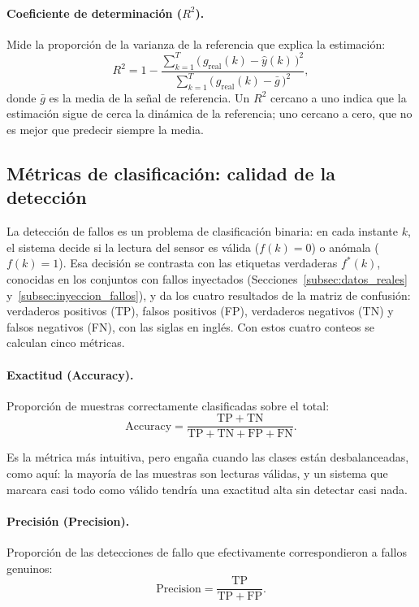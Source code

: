 \documentclass{report}
\begin{document}
\paragraph{Coeficiente de determinación ($R^2$).} Mide la proporción de la varianza de la referencia que explica la estimación:
\begin{equation}
\label{eq:r2}
R^{2} = 1 - \frac{\sum_{k=1}^{T} \big(\, g_{\mathrm{real}}(k) - \hat{y}(k) \,\big)^{2}}{\sum_{k=1}^{T} \big(\, g_{\mathrm{real}}(k) - \bar{g} \,\big)^{2}},
\end{equation}
donde $\bar{g}$ es la media de la señal de referencia. Un $R^2$ cercano a uno indica que la estimación sigue de cerca la dinámica de la referencia; uno cercano a cero, que no es mejor que predecir siempre la media.

\subsection{Métricas de clasificación: calidad de la detección}
\label{subsec:metricas_clasificacion}

La detección de fallos es un problema de clasificación binaria: en cada instante $k$, el sistema decide si la lectura del sensor es válida ($f(k) = 0$) o anómala ($f(k) = 1$). Esa decisión se contrasta con las etiquetas verdaderas $f^{*}(k)$, conocidas en los conjuntos con fallos inyectados (Secciones~\ref{subsec:datos_reales} y~\ref{subsec:inyeccion_fallos}), y da los cuatro resultados de la matriz de confusión: verdaderos positivos (TP), falsos positivos (FP), verdaderos negativos (TN) y falsos negativos (FN), con las siglas en inglés. Con estos cuatro conteos se calculan cinco métricas.

\paragraph{Exactitud (Accuracy).} Proporción de muestras correctamente clasificadas sobre el total:
\begin{equation}
\label{eq:accuracy}
\mathrm{Accuracy} = \frac{\mathrm{TP} + \mathrm{TN}}{\mathrm{TP} + \mathrm{TN} + \mathrm{FP} + \mathrm{FN}}.
\end{equation}

Es la métrica más intuitiva, pero engaña cuando las clases están desbalanceadas, como aquí: la mayoría de las muestras son lecturas válidas, y un sistema que marcara casi todo como válido tendría una exactitud alta sin detectar casi nada.

\paragraph{Precisión (Precision).} Proporción de las detecciones de fallo que efectivamente correspondieron a fallos genuinos:
\begin{equation}
\label{eq:precision}
\mathrm{Precision} = \frac{\mathrm{TP}}{\mathrm{TP} + \mathrm{FP}}.
\end{equation}
\end{document}
